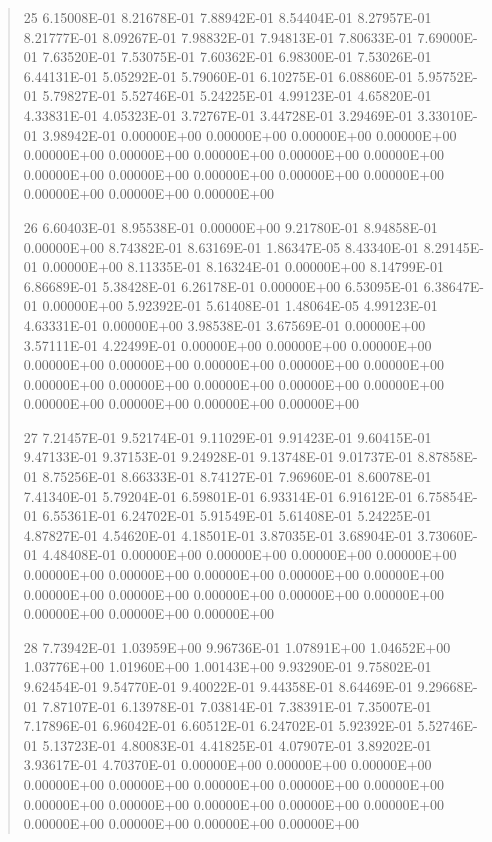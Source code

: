 \documentclass[letterpaper,10pt,english]{sphinxmanual}
\begin{document}
\begin{quote}
\begin{DUlineblock}{0em}
\item[] 25   6.15008E-01  8.21678E-01  7.88942E-01  8.54404E-01  8.27957E-01  8.21777E-01  8.09267E-01  7.98832E-01  7.94813E-01  7.80633E-01  7.69000E-01  7.63520E-01  7.53075E-01  7.60362E-01  6.98300E-01  7.53026E-01  6.44131E-01  5.05292E-01  5.79060E-01  6.10275E-01  6.08860E-01  5.95752E-01  5.79827E-01  5.52746E-01  5.24225E-01  4.99123E-01  4.65820E-01  4.33831E-01  4.05323E-01  3.72767E-01  3.44728E-01  3.29469E-01  3.33010E-01  3.98942E-01  0.00000E+00  0.00000E+00  0.00000E+00  0.00000E+00  0.00000E+00  0.00000E+00  0.00000E+00  0.00000E+00  0.00000E+00  0.00000E+00  0.00000E+00  0.00000E+00  0.00000E+00  0.00000E+00  0.00000E+00  0.00000E+00  0.00000E+00
\item[] 26   6.60403E-01  8.95538E-01  0.00000E+00  9.21780E-01  8.94858E-01  0.00000E+00  8.74382E-01  8.63169E-01  1.86347E-05  8.43340E-01  8.29145E-01  0.00000E+00  8.11335E-01  8.16324E-01  0.00000E+00  8.14799E-01  6.86689E-01  5.38428E-01  6.26178E-01  0.00000E+00  6.53095E-01  6.38647E-01  0.00000E+00  5.92392E-01  5.61408E-01  1.48064E-05  4.99123E-01  4.63331E-01  0.00000E+00  3.98538E-01  3.67569E-01  0.00000E+00  3.57111E-01  4.22499E-01  0.00000E+00  0.00000E+00  0.00000E+00  0.00000E+00  0.00000E+00  0.00000E+00  0.00000E+00  0.00000E+00  0.00000E+00  0.00000E+00  0.00000E+00  0.00000E+00  0.00000E+00  0.00000E+00  0.00000E+00  0.00000E+00  0.00000E+00
\item[] 27   7.21457E-01  9.52174E-01  9.11029E-01  9.91423E-01  9.60415E-01  9.47133E-01  9.37153E-01  9.24928E-01  9.13748E-01  9.01737E-01  8.87858E-01  8.75256E-01  8.66333E-01  8.74127E-01  7.96960E-01  8.60078E-01  7.41340E-01  5.79204E-01  6.59801E-01  6.93314E-01  6.91612E-01  6.75854E-01  6.55361E-01  6.24702E-01  5.91549E-01  5.61408E-01  5.24225E-01  4.87827E-01  4.54620E-01  4.18501E-01  3.87035E-01  3.68904E-01  3.73060E-01  4.48408E-01  0.00000E+00  0.00000E+00  0.00000E+00  0.00000E+00  0.00000E+00  0.00000E+00  0.00000E+00  0.00000E+00  0.00000E+00  0.00000E+00  0.00000E+00  0.00000E+00  0.00000E+00  0.00000E+00  0.00000E+00  0.00000E+00  0.00000E+00
\item[] 28   7.73942E-01  1.03959E+00  9.96736E-01  1.07891E+00  1.04652E+00  1.03776E+00  1.01960E+00  1.00143E+00  9.93290E-01  9.75802E-01  9.62454E-01  9.54770E-01  9.40022E-01  9.44358E-01  8.64469E-01  9.29668E-01  7.87107E-01  6.13978E-01  7.03814E-01  7.38391E-01  7.35007E-01  7.17896E-01  6.96042E-01  6.60512E-01  6.24702E-01  5.92392E-01  5.52746E-01  5.13723E-01  4.80083E-01  4.41825E-01  4.07907E-01  3.89202E-01  3.93617E-01  4.70370E-01  0.00000E+00  0.00000E+00  0.00000E+00  0.00000E+00  0.00000E+00  0.00000E+00  0.00000E+00  0.00000E+00  0.00000E+00  0.00000E+00  0.00000E+00  0.00000E+00  0.00000E+00  0.00000E+00  0.00000E+00  0.00000E+00  0.00000E+00

\end{DUlineblock}
\end{quote}
\end{document}
